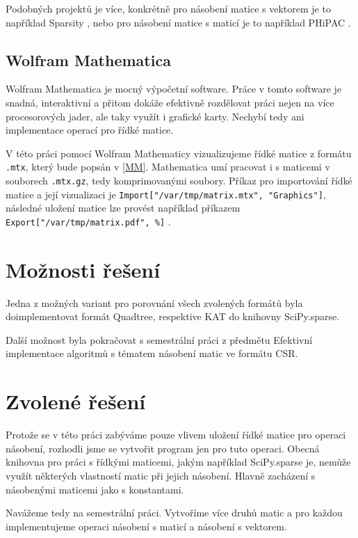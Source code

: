 Podobných projektů je více, konkrétně pro násobení matice s vektorem je to například Sparsity \cite{sparsity}, nebo pro násobení matice s maticí je to například PHiPAC \cite{PHiPAC}\cite{bilmes96a}.

\subsection{Wolfram Mathematica}

Wolfram Mathematica \cite{mathematica} je mocný výpočetní software. Práce v tomto software je snadná, interaktivní a přitom dokáže efektivně rozdělovat práci nejen na více procesorových jader, ale taky využít i grafické karty. Nechybí tedy ani implementace operací pro řídké matice.

V této práci pomocí Wolfram Mathematicy vizualizujeme řídké matice z formátu \texttt{.mtx}, který bude popsán v \ref{MM}. Mathematica umí pracovat i s maticemi v souborech \texttt{.mtx.gz}, tedy komprimovanými soubory. Příkaz pro importování řídké matice a její vizualizaci je \texttt{Import["/var/tmp/matrix.mtx", "Graphics"]}, následné uložení matice lze provést například příkazem \\ \texttt{Export["/var/tmp/matrix.pdf", \%]} \cite{mathematicaMTX}.

\section{Možnosti řešení}

Jedna z možných variant pro porovnání všech zvolených formátů byla doimplementovat formát Quadtree, respektive KAT do knihovny SciPy.sparse.

Další možnost byla pokračovat s semestrální práci z předmětu Efektivní implementace algoritmů s tématem násobení matic ve formátu CSR.

\section{Zvolené řešení}

Protože se v této práci zabýváme pouze vlivem uložení řídké matice pro operaci násobení, rozhodli jsme se vytvořit program jen pro tuto operaci. Obecná knihovna pro práci s řídkými maticemi, jakým například SciPy.sparse je, nemůže využít některých vlastností matic při jejich násobení. Hlavně zacházení s násobenými maticemi jako s konstantami.

Navážeme tedy na semestrální práci. Vytvoříme více druhů matic a pro každou implementujeme operaci násobení s maticí a násobení s vektorem.